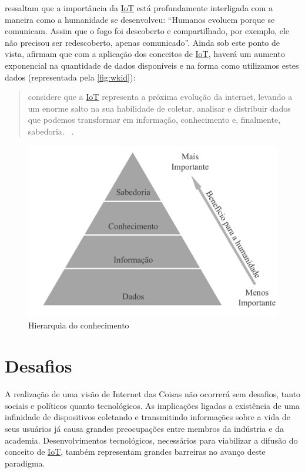 \documentclass[twoside,english,brazilian]{UNISINOSmonografia}
\begin{document}
	 ressaltam que a importância da \hyperref[siglas]{IoT} está 
	profundamente interligada com a maneira como a humanidade se desenvolveu: 
	``Humanos evoluem porque se comunicam. Assim que o fogo foi descoberto 
	e compartilhado, por exemplo, ele não precisou ser redescoberto, 
	apenas comunicado''. Ainda sob este ponto de vista, afirmam que com a 
	aplicação dos conceitos de \hyperref[siglas]{IoT}, haverá um aumento exponencial na 
	quantidade de dados disponíveis e na forma como utilizamos estes dados
	(representada pela \autoref{fig:wkid}):
	
	\begin{quote}
		considere que a \hyperref[siglas]{IoT} representa a próxima evolução da internet, 
		levando a um enorme salto na sua habilidade de coletar, analisar e 
		distribuir dados que podemos transformar em informação, 
		conhecimento e, finalmente, sabedoria.~
		\cite[p.~2]{Cisco2011}.
	\end{quote}

	\begin{figure}
		\caption{Hierarquia do conhecimento}
		\label{fig:wkid}
		\centering
		\begin{minipage}{.8\textwidth}
			\includegraphics[width=\textwidth]{wkid}
		\end{minipage}
	\end{figure}


\section{Desafios}


A realização de uma visão de Internet das Coisas não ocorrerá sem desafios, 
tanto sociais e políticos quanto tecnológicos.
As implicações ligadas a existência de uma infinidade de dispositivos 
coletando e transmitindo informações sobre a vida de seus usuários 
já causa grandes preocupações entre membros da indústria e da academia.
Desenvolvimentos tecnológicos, necessários para viabilizar a difusão do 
conceito de \hyperref[siglas]{IoT}, também representam grandes barreiras no avanço deste 
paradigma.
\end{document}
